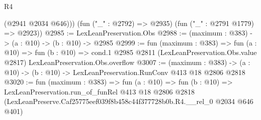 \begin{lexlean}{R4}
\begin{coremodule}
          (@2941 @2034 @646)))
      (fun ("_" : @2792) => @2935)
      (fun ("_" : @2791 @1779) => @2923))
@2985 := LexLeanPreservation.Obs
@2988 := (maximum : @383) -> (a : @10) -> (b : @10) -> @2985
@2999 := fun (maximum : @383) =>
  fun (a : @10) =>
  fun (b : @10) =>
  cond.{1} @2985 @2811 (LexLeanPreservation.Obs.value @2817) LexLeanPreservation.Obs.overflow
@3007 := (maximum : @383) ->
  (a : @10) -> (b : @10) -> LexLeanPreservation.RunConv @413 @18 @2806 @2818
@3020 := fun (maximum : @383) =>
  fun (a : @10) =>
  fun (b : @10) =>
  LexLeanPreservation.run_of_funRel
    @413
    @18
    @2806
    @2818
    (LexLeanPreserve.Caf25775eef039f8b458c44f377728b0b.R4.__rel_0 @2034 @646 @401)
\end{coremodule}
\end{lexlean}
